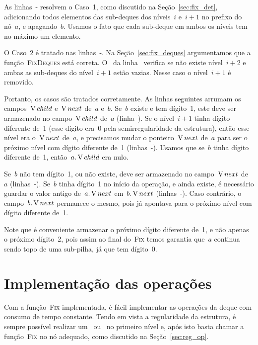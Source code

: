 \documentclass[../../main.tex]{subfiles}
\begin{document}
As linhas~{-} resolvem o Caso~1, como discutido na Seção~\ref{sec:fix_det}, adicionando todos elementos das sub-deques dos níveis~$i$ e~$i+1$ no prefixo do nó~$a$, e apagando~$b$. Usamos o fato que cada sub-deque em ambos os níveis tem no máximo um elemento.

O Caso~2 é tratado nas linhas~{-}. Na Seção~\ref{sec:fix_deques} argumentamos que a função~\textsc{FixDeques} está correta. O~ da linha~ verifica se não existe nível~$i+2$ e ambas as sub-deques do nível~$i+1$ estão vazias. Nesse caso o nível~$i+1$ é removido.

Portanto, os casos são tratados corretamente. As linhas seguintes arrumam os campos~$\operatorname{V}{child}$ e~$\operatorname{V}{next}$ de~$a$ e~$b$. Se~$b$ existe e tem dígito~1, este deve ser armazenado no campo~$\operatorname{V}{child}$ de~$a$ (linha~). Se o nível~$i+1$ tinha dígito diferente de~1 (esse dígito era~0 pela semirregularidade da estrutura), então esse nível era o~$\operatorname{V}{next}$ de~$a$, e precisamos mudar o ponteiro~$\operatorname{V}{next}$ de~$a$ para ser o próximo nível com dígito diferente de~1 (linhas~-). Usamos que se~$b$ tinha dígito diferente de~1, então~$a.\operatorname{V}{child}$ era nulo.

Se~$b$ não tem dígito~1, ou não existe, deve ser armazenado no campo~$\operatorname{V}{next}$ de~$a$ (linhas~-).
Se~$b$ tinha dígito~1 no início da operação, e ainda existe, é necessário guardar o valor antigo de~$a.\operatorname{V}{next}$ em~$b.\operatorname{V}{next}$ (linhas~-). Caso contrário, o campo~$b.\operatorname{V}{next}$ permanece o mesmo, pois já apontava para o próximo nível com dígito diferente de~1.

Note que é conveniente armazenar o próximo dígito diferente de~1, e não apenas o próximo dígito~2, pois assim ao final do~\textsc{Fix} temos garantia que~$a$ continua sendo topo de uma sub-pilha, já que tem dígito~0.

\section{Implementação das operações}

Com a função~\textsc{Fix} implementada, é fácil implementar as operações da deque com consumo de tempo constante. Tendo em vista a regularidade da estrutura, é sempre possível realizar um~ ou~ no primeiro nível e, após isto basta chamar a função~\textsc{Fix} no nó adequado, como discutido na Seção~\ref{sec:reg_op}.
\end{document}
